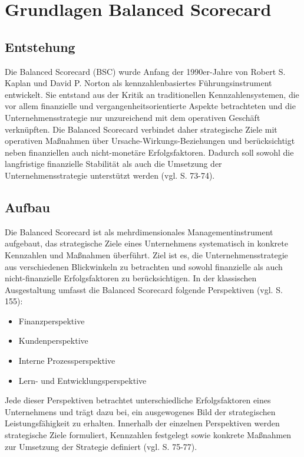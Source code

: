 
\section{Grundlagen Balanced Scorecard}
\subsection{Entstehung}
Die Balanced Scorecard (BSC) wurde Anfang der 1990er-Jahre von Robert S. Kaplan und David P. Norton als kennzahlenbasiertes Führungsinstrument entwickelt. Sie entstand aus der Kritik an traditionellen Kennzahlensystemen, die vor allem finanzielle und vergangenheitsorientierte Aspekte betrachteten und die Unternehmensstrategie nur unzureichend mit dem operativen Geschäft verknüpften. Die Balanced Scorecard verbindet daher strategische Ziele mit operativen Maßnahmen über Ursache-Wirkungs-Beziehungen und berücksichtigt neben finanziellen auch nicht-monetäre Erfolgsfaktoren. Dadurch soll sowohl die langfristige finanzielle Stabilität als auch die Umsetzung der Unternehmensstrategie unterstützt werden (vgl. \cite{gadatsch_it-controlling_2026} S. 73-74).

\subsection{Aufbau}
Die Balanced Scorecard ist als mehrdimensionales Managementinstrument aufgebaut, das strategische Ziele eines Unternehmens systematisch in konkrete Kennzahlen und Maßnahmen überführt. Ziel ist es, die Unternehmensstrategie aus verschiedenen Blickwinkeln zu betrachten und sowohl finanzielle als auch nicht-finanzielle Erfolgsfaktoren zu berücksichtigen. In der klassischen Ausgestaltung umfasst die Balanced Scorecard folgende Perspektiven (vgl. \cite{kornert_perspektiven_2006} S. 155):

\begin{itemize}
	\item Finanzperspektive
	\item Kundenperspektive
	\item Interne Prozessperspektive
	\item Lern- und Entwicklungsperspektive
\end{itemize}

Jede dieser Perspektiven betrachtet unterschiedliche Erfolgsfaktoren eines Unternehmens und trägt dazu bei, ein ausgewogenes Bild der strategischen Leistungsfähigkeit zu erhalten. Innerhalb der einzelnen Perspektiven werden strategische Ziele formuliert, Kennzahlen festgelegt sowie konkrete Maßnahmen zur Umsetzung der Strategie definiert (vgl. \cite{gadatsch_it-controlling_2026} S. 75-77).

